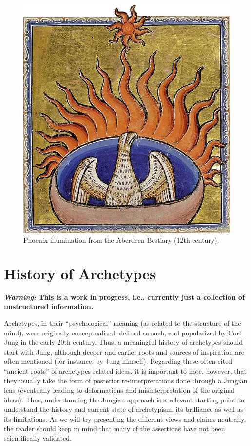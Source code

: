 \documentclass[
]{book}
\begin{document}
\begin{figure}

{\centering \includegraphics[width=\textwidth]{img/phoenix_aberdeen_bestiary} 

}

\caption{Phoenix illumination from the Aberdeen Bestiary (12th century).}\label{fig:unnamed-chunk-5}
\end{figure}

\hypertarget{history-of-archetypes}{%
\chapter{History of Archetypes}\label{history-of-archetypes}}

\textbf{\emph{Warning:} This is a work in progress, i.e., currently just a collection of unstructured information.}

Archetypes, in their ``psychological'' meaning (as related to the structure of the mind), were originally conceptualised, defined as such, and popularized by Carl Jung in the early 20th century. Thus, a meaningful history of archetypes should start with Jung, although deeper and earlier roots and sources of inspiration are often mentioned (for instance, by Jung himself). Regarding these often-cited ``ancient roots'' of archetypes-related ideas, it is important to note, however, that they usually take the form of posterior re-interpretations done through a Jungian lens (eventually leading to deformations and misinterpretation of the original ideas). Thus, understanding the Jungian approach is a relevant starting point to understand the history and current state of archetypism, its brilliance as well as its limitations. As we will try presenting the different views and claims neutrally, the reader should keep in mind that many of the assertions have not been scientifically validated.
\end{document}
